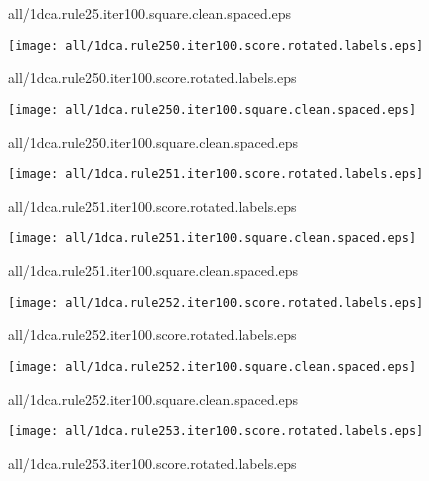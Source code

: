 \documentclass{article}
\begin{document}
{\footnotesize all/1dca.rule25.iter100.square.clean.spaced.eps}
\begin{center}
\begin{minipage}{\textwidth}
\texttt{[image: all/1dca.rule250.iter100.score.rotated.labels.eps]}
\end{minipage}
\end{center}
{\footnotesize all/1dca.rule250.iter100.score.rotated.labels.eps}
\begin{center}
\begin{minipage}{\textwidth}
\texttt{[image: all/1dca.rule250.iter100.square.clean.spaced.eps]}
\end{minipage}
\end{center}
{\footnotesize all/1dca.rule250.iter100.square.clean.spaced.eps}
\begin{center}
\begin{minipage}{\textwidth}
\texttt{[image: all/1dca.rule251.iter100.score.rotated.labels.eps]}
\end{minipage}
\end{center}
{\footnotesize all/1dca.rule251.iter100.score.rotated.labels.eps}
\begin{center}
\begin{minipage}{\textwidth}
\texttt{[image: all/1dca.rule251.iter100.square.clean.spaced.eps]}
\end{minipage}
\end{center}
{\footnotesize all/1dca.rule251.iter100.square.clean.spaced.eps}
\begin{center}
\begin{minipage}{\textwidth}
\texttt{[image: all/1dca.rule252.iter100.score.rotated.labels.eps]}
\end{minipage}
\end{center}
{\footnotesize all/1dca.rule252.iter100.score.rotated.labels.eps}
\begin{center}
\begin{minipage}{\textwidth}
\texttt{[image: all/1dca.rule252.iter100.square.clean.spaced.eps]}
\end{minipage}
\end{center}
{\footnotesize all/1dca.rule252.iter100.square.clean.spaced.eps}
\begin{center}
\begin{minipage}{\textwidth}
\texttt{[image: all/1dca.rule253.iter100.score.rotated.labels.eps]}
\end{minipage}
\end{center}
{\footnotesize all/1dca.rule253.iter100.score.rotated.labels.eps}
\end{document}
